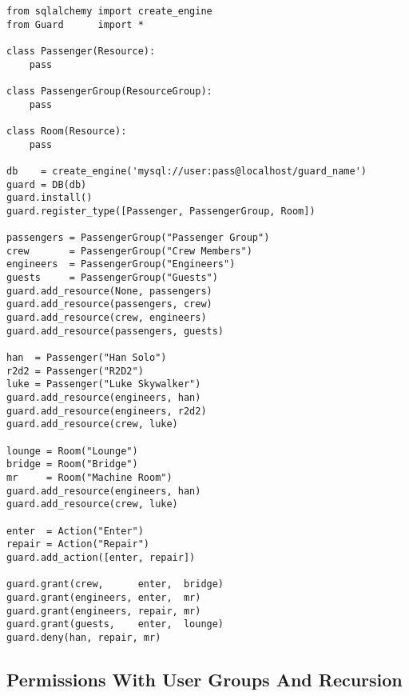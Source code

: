 \begin{lstlisting}
from sqlalchemy import create_engine
from Guard      import *

class Passenger(Resource):
    pass

class PassengerGroup(ResourceGroup):
    pass

class Room(Resource):
    pass

db    = create_engine('mysql://user:pass@localhost/guard_name')
guard = DB(db)
guard.install()
guard.register_type([Passenger, PassengerGroup, Room])

passengers = PassengerGroup("Passenger Group")
crew       = PassengerGroup("Crew Members")
engineers  = PassengerGroup("Engineers")
guests     = PassengerGroup("Guests")
guard.add_resource(None, passengers)
guard.add_resource(passengers, crew)
guard.add_resource(crew, engineers)
guard.add_resource(passengers, guests)

han  = Passenger("Han Solo")
r2d2 = Passenger("R2D2")
luke = Passenger("Luke Skywalker")
guard.add_resource(engineers, han)
guard.add_resource(engineers, r2d2)
guard.add_resource(crew, luke)

lounge = Room("Lounge")
bridge = Room("Bridge")
mr     = Room("Machine Room")
guard.add_resource(engineers, han)
guard.add_resource(crew, luke)

enter  = Action("Enter")
repair = Action("Repair")
guard.add_action([enter, repair])

guard.grant(crew,      enter,  bridge)
guard.grant(engineers, enter,  mr)
guard.grant(engineers, repair, mr)
guard.grant(guests,    enter,  lounge)
guard.deny(han, repair, mr)
\end{lstlisting}


\subsection{Permissions With User Groups And Recursion}

